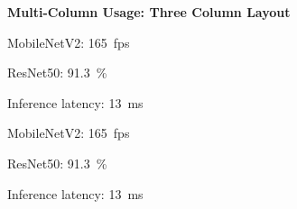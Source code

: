 \documentclass[12pt,onecolumn]{article}
\begin{document}
    \textbf{Multi-Column Usage: Three Column Layout}
      \begin{tcolorbox}[enhanced, sharp corners=south, colframe=white, colback=white, boxrule=0pt, top=0pt, bottom=0pt, left=0pt, right=0pt]
        \begin{minipage}[t]{0.32\textwidth}
          \begin{ktbox}[theme=blue, title=Speed]
            MobileNetV2: \SI{165}{fps}
          \end{ktbox}
        \end{minipage}\hfill
        \begin{minipage}[t]{0.32\textwidth}
          \begin{ktbox}[theme=orange, title=Accuracy]
            ResNet50: \SI{91.3}{\percent}
          \end{ktbox}
        \end{minipage}\hfill
        \begin{minipage}[t]{0.32\textwidth}
          \begin{ktbox}[theme=red, title=Latency]
            Inference latency: \SI{13}{ms}
          \end{ktbox}
        \end{minipage}
      \end{tcolorbox}

      \begin{ktbox}[theme=gray]
        \begin{codeblock}
\begin{tcolorbox}[enhanced, sharp corners=south, colframe=white, colback=white, boxrule=0pt, top=0pt, bottom=0pt, left=0pt, right=0pt]
  \begin{minipage}[t]{0.32\textwidth}
    \begin{ktbox}[theme=blue, title=Speed]
      MobileNetV2: \SI{165}{fps}
    \end{ktbox}
  \end{minipage}\hfill
  \begin{minipage}[t]{0.32\textwidth}
    \begin{ktbox}[theme=orange, title=Accuracy]
      ResNet50: \SI{91.3}{\percent}
    \end{ktbox}
  \end{minipage}\hfill
  \begin{minipage}[t]{0.32\textwidth}
    \begin{ktbox}[theme=red, title=Latency]
      Inference latency: \SI{13}{ms}
    \end{ktbox}
  \end{minipage}
\end{tcolorbox}
        \end{codeblock}
      \end{ktbox}
\end{document}
